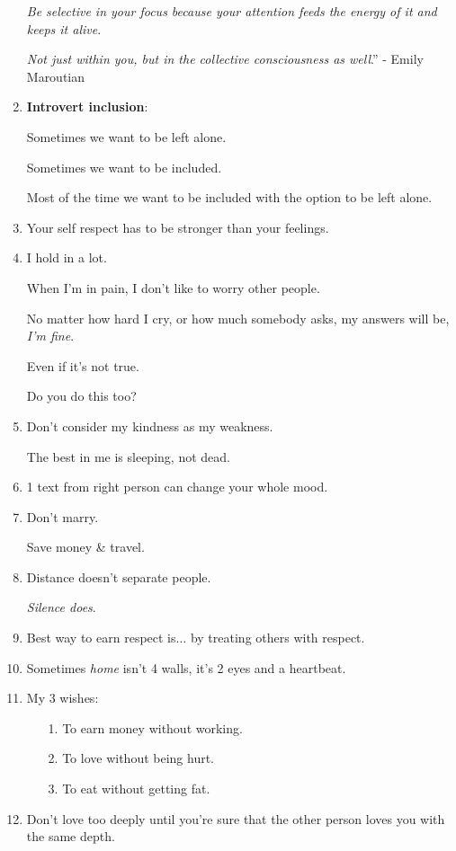\documentclass{article}
\numberwithin{equation}{section}
\begin{document}
\begin{enumerate}
    \textit{Be selective in your focus because your attention feeds the energy of it and keeps it alive}.
    
    \textit{Not just within you, but in the collective consciousness as well}.'' - Emily Maroutian
    \item \textbf{Introvert inclusion}:
    
    Sometimes we want to be left alone.
    
    Sometimes we want to be included.
    
    Most of the time we want to be included with the option to be left alone.
    \item Your self respect has to be stronger than your feelings.
    \item I hold in a lot.
    
    When I'm in pain, I don't like to worry other people.
    
    No matter how hard I cry, or how much somebody asks, my answers will be, \textit{I'm fine}.
    
    Even if it's not true.
    
    Do you do this too?
    \item Don't consider my kindness as my weakness.
    
    The best in me is sleeping, not dead.
    \item 1 text from right person can change your whole mood.
    \item Don't marry.
    
    Save money \& travel.
    \item Distance doesn't separate people.
    
    \textit{Silence does}.
    \item Best way to earn respect is$\ldots$ by treating others with respect.
    \item Sometimes \textit{home} isn't 4 walls, it's 2 eyes and a heartbeat.
    \item My 3 wishes:
    \begin{itemize}
        \item[1.] To earn money without working.
        \item[2.] To love without being hurt.
        \item[3.] To eat without getting fat.
    \end{itemize}
    \item Don't love too deeply until you're sure that the other person loves you with the same depth.
    

\end{enumerate}
\end{document}
